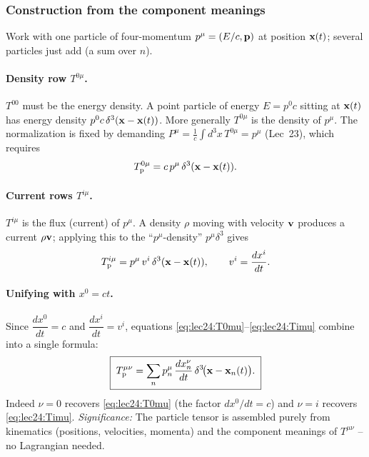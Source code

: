 \subsubsection*{Construction from the component meanings}
Work with one particle of four-momentum $p^\mu=(E/c,\mathbf{p})$ at position $\mathbf{x}(t)$;
several particles just add (a sum over $n$).

\paragraph{Density row $T^{0\mu}$.}
$T^{00}$ must be the energy density. A point particle of energy $E=p^0c$ sitting at
$\mathbf{x}(t)$ has energy density $p^0c\,\delta^3(\mathbf{x}-\mathbf{x}(t))$. More generally
$T^{0\mu}$ is the density of $p^\mu$. The normalization is fixed by demanding
$P^\mu=\tfrac1c\int d^3x\,T^{0\mu}=p^\mu$ (Lec~23), which requires
\begin{equation}\label{eq:lec24:T0mu}
  T^{0\mu}_{\text{p}}=c\,p^\mu\,\delta^3(\mathbf{x}-\mathbf{x}(t)).
\end{equation}

\paragraph{Current rows $T^{i\mu}$.}
$T^{i\mu}$ is the flux (current) of $p^\mu$. A density $\rho$ moving with velocity $\mathbf{v}$
produces a current $\rho\mathbf{v}$; applying this to the ``$p^\mu$-density''
$p^\mu\delta^3$ gives
\begin{equation}\label{eq:lec24:Timu}
  T^{i\mu}_{\text{p}}=p^\mu\,v^i\,\delta^3(\mathbf{x}-\mathbf{x}(t)),
  \qquad v^i=\frac{dx^i}{dt}.
\end{equation}

\paragraph{Unifying with $x^0=ct$.}
Since $\dfrac{dx^0}{dt}=c$ and $\dfrac{dx^i}{dt}=v^i$, equations
\eqref{eq:lec24:T0mu}--\eqref{eq:lec24:Timu} combine into a single formula:
\begin{equation}\label{eq:lec24:Tmunu-practical}
  \boxed{\;T^{\mu\nu}_{\text{p}}=\sum_n p_n^{\mu}\,\frac{dx_n^{\nu}}{dt}\,
        \delta^3\!\big(\mathbf{x}-\mathbf{x}_n(t)\big).\;}
\end{equation}
Indeed $\nu=0$ recovers \eqref{eq:lec24:T0mu} (the factor $dx^0/dt=c$) and $\nu=i$ recovers
\eqref{eq:lec24:Timu}.
\textit{Significance:} The particle tensor is assembled purely from kinematics
(positions, velocities, momenta) and the component meanings of $T^{\mu\nu}$ -- no
Lagrangian needed.

